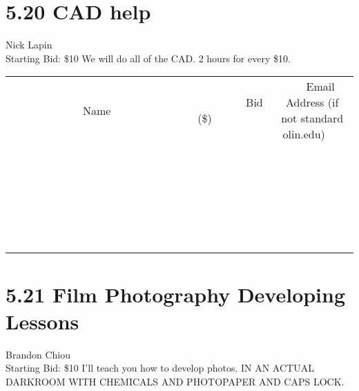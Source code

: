 \documentclass[11pt]{article}
\begin{document}
\section*{5.20 CAD help}
Nick Lapin
\\
Starting Bid: \$10
\newline
We will do all of the CAD. 2 hours for every \$10.
\\[6ex]
\begin{tabular}{c c c}
~~~~~~~~~~~~~Name~~~~~~~~~~~~~ & ~~~~~~~~~Bid (\$)~~~~~~~~~  & ~~~Email Address (if not standard olin.edu)~~~\\
 & & \\
\hline
 & & \\
\hline
 & & \\
\hline
 & & \\
\hline
 & & \\
\hline
 & & \\
\hline
 & & \\
\hline
 & & \\
\hline
 & & \\
\hline
 & & \\
\hline
 & & \\
\hline
 & & \\
\hline
 & & \\
\hline
 & & \\
\hline
 & & \\
\hline
 & & \\
\hline
 & & \\
\hline
 & & \\
\hline
 & & \\
\hline
 & & \\
\hline
 & & \\
\hline
 & & \\
\hline
 & & \\
\hline
 & & \\
\hline
 & & \\
\hline
 & & \\
\hline
\end{tabular}
\newpage
\section*{5.21 Film Photography Developing Lessons}
Brandon Chiou
\\
Starting Bid: \$10
\newline
I'll teach you how to develop photos. IN AN ACTUAL DARKROOM WITH CHEMICALS AND PHOTOPAPER AND CAPS LOCK.
\end{document}
